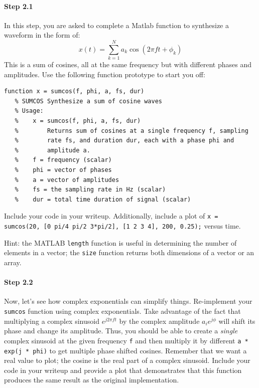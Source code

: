\paragraph{Step 2.1} In this step, you are asked to complete a Matlab
function to synthesize a waveform in the form of:
\begin{equation*}
x(t) = \sum_{k=1}^N a_k\cos(2\pi f t + \phi_k)
\end{equation*}
This is a sum of cosines, all at the same frequency but with different
phases and amplitudes.  Use the following function prototype to start you off:
\begin{lstlisting}[style=Matlab-editor,basicstyle=\mlttfamily\small]
   function x = sumcos(f, phi, a, fs, dur)
   % SUMCOS Synthesize a sum of cosine waves
   % Usage:
   %    x = sumcos(f, phi, a, fs, dur)
   %        Returns sum of cosines at a single frequency f, sampling
   %        rate fs, and duration dur, each with a phase phi and
   %        amplitude a.
   %    f = frequency (scalar)
   %    phi = vector of phases
   %    a = vector of amplitudes
   %    fs = the sampling rate in Hz (scalar)
   %    dur = total time duration of signal (scalar)
\end{lstlisting}


Include your code in your writeup. Additionally, include a plot of
\texttt{x = sumcos(20, [0 pi/4 pi/2 3*pi/2], [1 2 3 4], 200, 0.25);} versus
time.

Hint: the MATLAB \verb|length| function is useful in determining the
number of elements in a vector; the \verb|size| function returns both
dimensions of a vector or an array.


\paragraph{Step 2.2} Now, let's see how complex exponentials can
simplify things. Re-implement your \texttt{sumcos} function using
complex exponentials. Take advantage of the fact that multiplying a
complex sinusoid $e^{j2\pi f t}$ by the complex amplitude
$a_ie^{j\phi}$ will shift its phase and change its amplitude. Thus,
you should be able to create a \emph{single} complex sinusoid at the
given frequency \texttt{f} and then multiply it by different \texttt{a
  * exp(j * phi)} to get multiple phase shifted cosines. Remember that
we want a real value to plot; the cosine is the real part of a complex
sinusoid. Include your code in your writeup and provide a plot that
demonstrates that this function produces the same result as the
original implementation.


